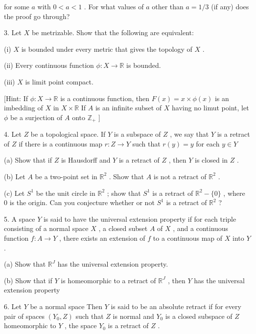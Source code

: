 \documentclass[10pt]{article}
\begin{document}
for some \(a\) with \(0 < a < 1\) . For what values of \(a\) other than \(a = 1/3\) (if any) does the proof go through?

3. Let \(X\) be metrizable. Show that the following are equivalent:

(i) \(X\) is bounded under every metric that gives the topology of \(X\) .

(ii) Every continuous function \(\phi  : X \rightarrow  \mathbb{R}\) is bounded.

(iii) \(X\) is limit point compact.

[Hint: If \(\phi  : X \rightarrow  \mathbb{R}\) is a continuous function, then \(F\left( x\right)  = x \times  \phi \left( x\right)\) is an imbedding of \(X\) in \(X \times  \mathbb{R}\) If \(A\) is an infinite subset of \(X\) having no limut point, let \(\phi\) be a surjection of \(A\) onto \({\mathbb{Z}}_{ + }\) ]

4. Let \(Z\) be a topological space. If \(Y\) is a subspace of \(Z\) , we say that \(Y\) is a retract of \(Z\) if there is a continuous map \(r : Z \rightarrow  Y\) such that \(r\left( y\right)  = y\) for each \(y \in  Y\)

(a) Show that if \(Z\) is Hausdorff and \(Y\) is a retract of \(Z\) , then \(Y\) is closed in \(Z\) .

(b) Let \(A\) be a two-point set in \({\mathbb{R}}^{2}\) . Show that \(A\) is not a retract of \({\mathbb{R}}^{2}\) .

(c) Let \({S}^{1}\) be the unit circle in \({\mathbb{R}}^{2}\) ; show that \({S}^{1}\) is a retract of \({\mathbb{R}}^{2} - \{ 0\}\) , where 0 is the origin. Can you conjecture whether or not \({S}^{1}\) is a retract of \({\mathbb{R}}^{2}\) ?

5. A space \(Y\) is said to have the universal extension property if for each triple consisting of a normal space \(X\) , a closed subset \(A\) of \(X\) , and a continuous function \(f : A \rightarrow  Y\) , there exists an extension of \(f\) to a continuous map of \(X\) into \(Y\) .

(a) Show that \({\mathbb{R}}^{J}\) has the universal extension property.

(b) Show that if \(Y\) is homeomorphic to a retract of \({\mathbb{R}}^{J}\) , then \(Y\) has the universal extension property

6. Let \(Y\) be a normal space Then \(Y\) is said to be an absolute retract if for every pair of spaces \(\left( {{Y}_{0},Z}\right)\) such that \(Z\) is normal and \({Y}_{0}\) is a closed subspace of \(Z\) homeomorphic to \(Y\) , the space \({Y}_{0}\) is a retract of \(Z\) .
\end{document}
